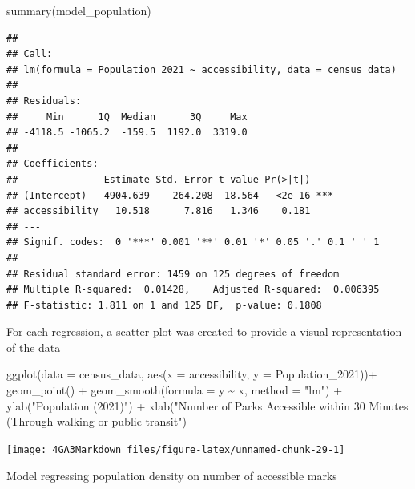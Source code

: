 \documentclass[
]{article}
\newenvironment{Shaded}{\begin{snugshade}}{\end{snugshade}}
\newcommand{\AttributeTok}[1]{\textcolor[rgb]{0.77,0.63,0.00}{#1}}
\newcommand{\FunctionTok}[1]{\textcolor[rgb]{0.00,0.00,0.00}{#1}}
\newcommand{\NormalTok}[1]{#1}
\newcommand{\SpecialCharTok}[1]{\textcolor[rgb]{0.00,0.00,0.00}{#1}}
\newcommand{\StringTok}[1]{\textcolor[rgb]{0.31,0.60,0.02}{#1}}
\begin{document}
\begin{Shaded}
\begin{Highlighting}[]
\FunctionTok{summary}\NormalTok{(model\_population)}
\end{Highlighting}
\end{Shaded}

\begin{verbatim}
## 
## Call:
## lm(formula = Population_2021 ~ accessibility, data = census_data)
## 
## Residuals:
##     Min      1Q  Median      3Q     Max 
## -4118.5 -1065.2  -159.5  1192.0  3319.0 
## 
## Coefficients:
##               Estimate Std. Error t value Pr(>|t|)    
## (Intercept)   4904.639    264.208  18.564   <2e-16 ***
## accessibility   10.518      7.816   1.346    0.181    
## ---
## Signif. codes:  0 '***' 0.001 '**' 0.01 '*' 0.05 '.' 0.1 ' ' 1
## 
## Residual standard error: 1459 on 125 degrees of freedom
## Multiple R-squared:  0.01428,    Adjusted R-squared:  0.006395 
## F-statistic: 1.811 on 1 and 125 DF,  p-value: 0.1808
\end{verbatim}

For each regression, a scatter plot was created to provide a visual
representation of the data

\begin{Shaded}
\begin{Highlighting}[]
\FunctionTok{ggplot}\NormalTok{(}\AttributeTok{data =}\NormalTok{ census\_data, }
       \FunctionTok{aes}\NormalTok{(}\AttributeTok{x =}\NormalTok{ accessibility, }
           \AttributeTok{y =}\NormalTok{ Population\_2021))}\SpecialCharTok{+}
  \FunctionTok{geom\_point}\NormalTok{() }\SpecialCharTok{+}
  \FunctionTok{geom\_smooth}\NormalTok{(}\AttributeTok{formula =}\NormalTok{ y }\SpecialCharTok{\textasciitilde{}}\NormalTok{ x,}
              \AttributeTok{method =} \StringTok{"lm"}\NormalTok{) }\SpecialCharTok{+}
  \FunctionTok{ylab}\NormalTok{(}\StringTok{"Population (2021)"}\NormalTok{) }\SpecialCharTok{+}
  \FunctionTok{xlab}\NormalTok{(}\StringTok{"Number of Parks Accessible within 30 Minutes (Through walking or public transit"}\NormalTok{) }
\end{Highlighting}
\end{Shaded}

\begin{center}\texttt{[image: 4GA3Markdown\_files/figure-latex/unnamed-chunk-29-1]} \end{center}

Model regressing population density on number of accessible marks
\end{document}
